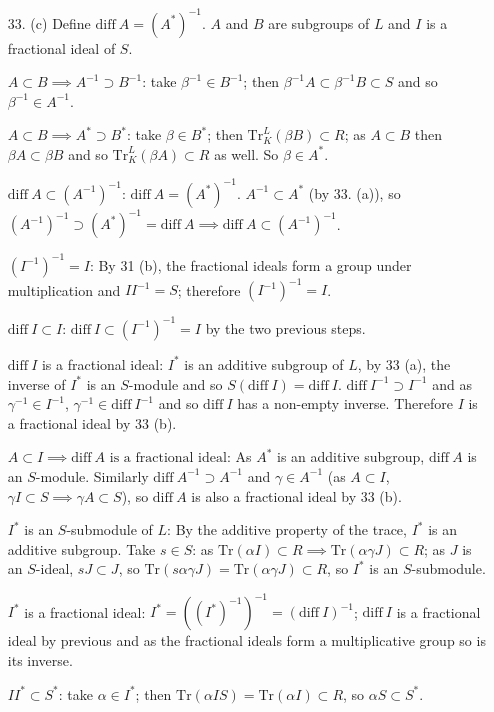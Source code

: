 \documentclass{article}
\newcommand{\trace}[1]{\text{Tr}(#1)}
\newcommand{\diff}[1]{\text{diff}\ #1}
\begin{document}
\begin{enumerate}
\item [33. (c)] Define $\diff A = (A^{*})^{-1}$.  $A$ and $B$ are subgroups of $L$ and $I$ is a fractional ideal of $S$.

$A \subset B \implies A^{-1} \supset B^{-1}$: take $\beta^{-1} \in B^{-1}$; then $\beta^{-1} A \subset \beta^{-1} B \subset S$ and so $\beta^{-1} \in A^{-1}$.

$A \subset B \implies A^{*} \supset B^{*}$: take $\beta \in B^{*}$; then $\text{Tr}^{L}_{K}(\beta B) \subset R$; as $A \subset B$ then $\beta A \subset \beta B$ and so $\text{Tr}^{L}_{K}(\beta A) \subset R$ as well.  So $\beta \in A^{*}$.

$\diff{A} \subset (A^{-1})^{-1}$: $\diff{A} = (A^{*})^{-1}$.  $A^{-1} \subset A^{*}$ (by 33. (a)), so $(A^{-1})^{-1} \supset (A^{*})^{-1} = \diff{A} \implies \diff{A} \subset (A^{-1})^{-1}$.

$(I^{-1})^{-1} = I$: By 31 (b), the fractional ideals form a group under multiplication and $I I^{-1} = S$; therefore $(I^{-1})^{-1} = I$.

$\diff{I} \subset I$: $\diff{I} \subset (I^{-1})^{-1} = I$ by the two previous steps.

$\diff{I}$ is a fractional ideal: $I^{*}$ is an additive subgroup of $L$, by 33 (a), the inverse of $I^{*}$ is an $S$-module and so $S(\diff {I}) = \diff{I}$.  $\diff{I}^{-1} \supset I^{-1}$ and as $\gamma^{-1} \in I^{-1}$, $\gamma^{-1} \in \diff{I}^{-1}$ and so $\diff{I}$ has a non-empty inverse.  Therefore $I$ is a fractional ideal by 33 (b).

$A \subset I \implies \diff{A} \text{ is a fractional ideal}$:  As $A^{*}$ is an additive subgroup, $\diff{A}$ is an $S$-module.  Similarly $\diff{A}^{-1} \supset A^{-1}$ and $\gamma \in A^{-1}$ (as $A \subset I$, $\gamma I \subset S \implies \gamma A \subset S$), so $\diff{A}$ is also a fractional ideal by 33 (b).

$I^{*}$ is an $S$-submodule of $L$:  By the additive property of the trace, $I^{*}$ is an additive subgroup.  Take $s \in S$: as $\trace{\alpha I} \subset R \implies \trace{\alpha \gamma J} \subset R$; as $J$ is an $S$-ideal, $s J\subset J$, so $\trace{s \alpha\gamma J} = \trace{\alpha \gamma J} \subset R$, so $I^{*}$ is an $S$-submodule.

$I^{*}$ is a fractional ideal: $I^{*} = ((I^{*})^{-1})^{-1} = (\diff{I})^{-1}$; $\diff{I}$ is a fractional ideal by previous and as the fractional ideals form a multiplicative group so is its inverse.

$II^{*} \subset S^{*}$: take $\alpha \in I^{*}$; then $\trace{\alpha I S} = \trace{\alpha I} \subset R$, so $\alpha S \subset S^{*}$.


\end{enumerate}
\end{document}
